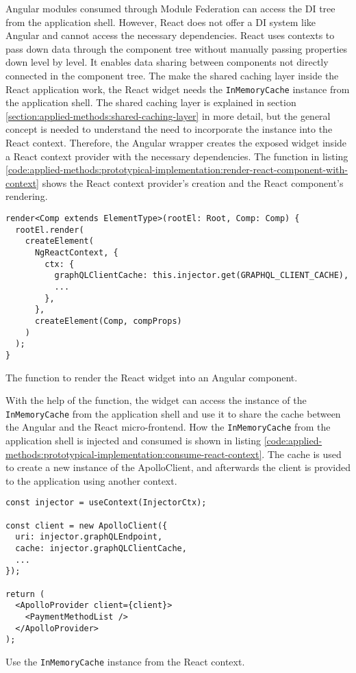 \noindent Angular modules consumed through Module Federation can access the \ac{DI} tree from the application shell. However, React does not offer a \ac{DI} system like Angular and cannot access the necessary dependencies. React uses contexts to pass down data through the component tree without manually passing properties down level by level. It enables data sharing between components not directly connected in the component tree. The make the shared caching layer inside the React application work, the React widget needs the \texttt{InMemoryCache} instance from the application shell. The shared caching layer is explained in section \ref{section:applied-methods:shared-caching-layer} in more detail, but the general concept is needed to understand the need to incorporate the instance into the React context. Therefore, the Angular wrapper creates the exposed widget inside a React context provider with the necessary dependencies. The function in listing \ref{code:applied-methods:prototypical-implementation:render-react-component-with-context} shows the React context provider's creation and the React component's rendering. 

\ifshowListings
\begin{listing}[H]
    \begin{verbatim}
render<Comp extends ElementType>(rootEl: Root, Comp: Comp) {
  rootEl.render(
    createElement(
      NgReactContext, {
        ctx: {
          graphQLClientCache: this.injector.get(GRAPHQL_CLIENT_CACHE),
          ...
        },
      },
      createElement(Comp, compProps)
    )
  );
}
    \end{verbatim}
    \caption{The function to render the React widget into an Angular component.}\label{code:applied-methods:prototypical-implementation:render-react-component-with-context}
\end{listing}
\fi

\noindent With the help of the function, the widget can access the instance of the \texttt{InMemoryCache} from the application shell and use it to share the cache between the Angular and the React micro-frontend. How the \texttt{InMemoryCache} from the application shell is injected and consumed is shown in listing \ref{code:applied-methods:prototypical-implementation:consume-react-context}. The cache is used to create a new instance of the ApolloClient, and afterwards the client is provided to the application using another context.

\ifshowListings
\begin{listing}[H]
    \begin{verbatim}
const injector = useContext(InjectorCtx);

const client = new ApolloClient({
  uri: injector.graphQLEndpoint,
  cache: injector.graphQLClientCache,
  ...
});

return (
  <ApolloProvider client={client}>
    <PaymentMethodList />
  </ApolloProvider>
);

    \end{verbatim}
    \caption{Use the \texttt{InMemoryCache} instance from the React context.}\label{code:applied-methods:prototypical-implementation:consume-react-context}
\end{listing}
\fi
